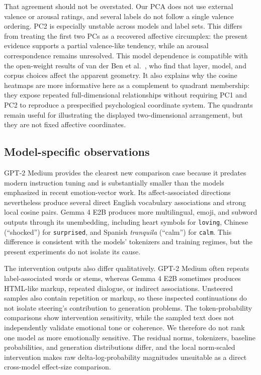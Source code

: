 That agreement should not be overstated. Our PCA does not use external valence or arousal ratings, and several labels do not follow a 
single valence ordering. PC2 is especially unstable across models and label sets. This differs from treating the first two PCs as a 
recovered affective circumplex: the present evidence supports a partial valence-like tendency, while an arousal correspondence 
remains unresolved. This model dependence is compatible with the open-weight results of van der Ben et al.\ \cite{ben_where_2026}, who 
find that layer, model, and corpus choices affect the apparent geometry. It also explains why the cosine heatmaps are more informative
here as a complement to quadrant membership: they expose repeated full-dimensional relationships without requiring PC1 and PC2 to 
reproduce a prespecified psychological coordinate system. The quadrants remain useful for illustrating the displayed two-dimensional 
arrangement, but they are not fixed affective coordinates.

\subsection{Model-specific observations}

GPT-2 Medium provides the clearest new comparison case because it predates modern instruction tuning and is substantially smaller than
the models emphasized in recent emotion-vector work. Its affect-associated directions nevertheless produce several direct English 
vocabulary associations and strong local cosine pairs. Gemma 4 E2B produces more multilingual, emoji, and subword outputs through 
its unembedding, including heart symbols for \texttt{loving}, Chinese  (``shocked'') for \texttt{surprised}, and Spanish 
\emph{tranquila} (``calm'') for \texttt{calm}. This difference is consistent 
with the models' tokenizers and training regimes, but the present experiments do not isolate its cause.

The intervention outputs also differ qualitatively. GPT-2 Medium often repeats label-associated words or stems, whereas Gemma 4 E2B 
sometimes produces HTML-like markup, repeated dialogue, or indirect associations. Unsteered samples also contain repetition or
markup, so these inspected continuations do not isolate steering's contribution to generation problems. The token-probability
comparisons show intervention sensitivity, while the sampled text does not independently validate emotional tone or coherence. We
therefore do not rank one model as more emotionally sensitive.
The residual norms, tokenizers, baseline probabilities, and generation distributions differ, and the local norm-scaled intervention 
makes raw delta-log-probability magnitudes unsuitable as a direct cross-model effect-size comparison.

